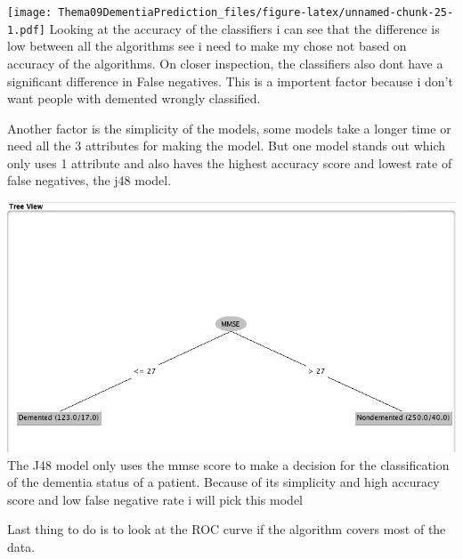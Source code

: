 \documentclass[
]{article}
\begin{document}
\texttt{[image: Thema09DementiaPrediction\_files/figure-latex/unnamed-chunk-25-1.pdf]}
Looking at the accuracy of the classifiers i can see that the difference
is low between all the algorithms see i need to make my chose not based
on accuracy of the algorithms. On closer inspection, the classifiers
also dont have a significant difference in False negatives. This is a
importent factor because i don't want people with demented wrongly
classified.

Another factor is the simplicity of the models, some models take a
longer time or need all the 3 attributes for making the model. But one
model stands out which only uses 1 attribute and also haves the highest
accuracy score and lowest rate of false negatives, the j48 model.

\includegraphics[width=1\linewidth]{J48Tree} The J48 model only uses the
mmse score to make a decision for the classification of the dementia
status of a patient. Because of its simplicity and high accuracy score
and low false negative rate i will pick this model

Last thing to do is to look at the ROC curve if the algorithm covers
most of the data.
\end{document}
